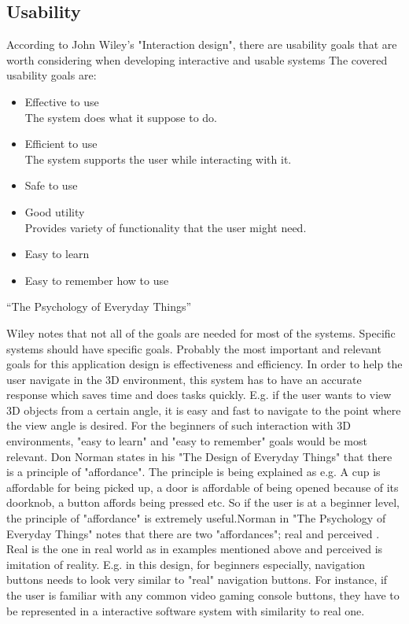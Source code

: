 \subsection{Usability}
\label{Usability}

According to John Wiley's "Interaction design", there are usability goals that are worth considering when developing interactive and usable systems \cite{Wileys} The covered usability goals are:

\begin{itemize}
\item Effective to use\\
The system does what it suppose to do.
\item Efficient to use\\
The system supports the user while interacting	
with it.
\item Safe to use
\item Good utility \\
Provides variety of functionality that the user might need.
\item Easy to learn
\item Easy to remember how to use
\end{itemize}

“The Psychology of Everyday Things”

Wiley notes that not all of the goals are needed for most of the systems\cite{Wileys}. Specific systems should have specific goals. Probably the most important and relevant goals for this application design is effectiveness and efficiency. In order to help the user navigate in the 3D environment, this system has to have an accurate response which saves time and does tasks quickly. E.g. if the user wants to view 3D objects from a certain angle, it is easy and fast to navigate to the point where the view angle is desired. For the beginners of such interaction with 3D environments, "easy to learn" and "easy to remember" goals would be most relevant. Don Norman states in his "The Design of Everyday Things" that there is a principle of "affordance". \cite{Normans} The principle is being explained as e.g. A cup is affordable for being picked up, a door is affordable of being opened because of its doorknob, a button affords being pressed etc. So if the user is at a beginner level, the principle of "affordance" is extremely useful.Norman in "The Psychology of Everyday Things" notes that there are two "affordances"; real and perceived . Real is the one in real world as in examples mentioned above and perceived is imitation of reality. E.g. in this design, for beginners especially, navigation buttons needs to look very similar to "real" navigation buttons. For instance, if the user is familiar with any common video gaming console buttons, they have to be represented in a interactive software system with similarity to real one. 

